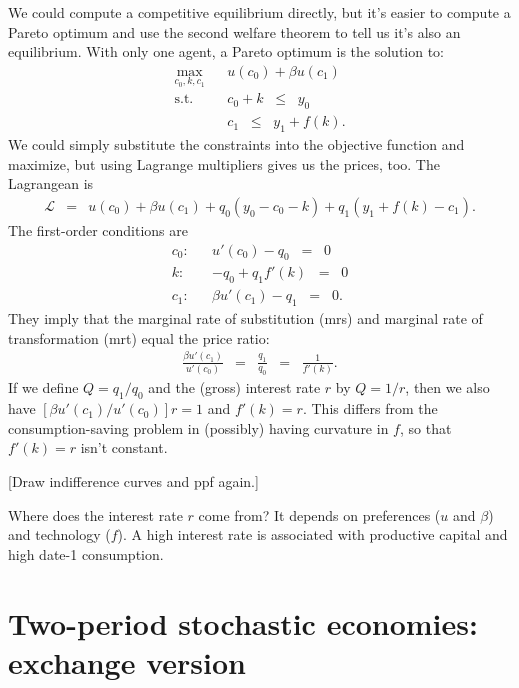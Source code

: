 \documentclass[11pt]{article}
\begin{document}
We could compute a competitive equilibrium directly,
but it's easier to compute a Pareto optimum and
use the second welfare theorem to tell us it's also
an equilibrium.
With only one agent, a Pareto optimum is the solution to:
\begin{eqnarray*}
    \max_{c_0,k,c_1} && u(c_0) + \beta u(c_1) \\
    \mbox{s.t.}   &&  c_0 + k \;\;\leq\;\; y_0 \\
                  &&  c_1 \;\;\leq\;\;  y_1 + f(k) .
\end{eqnarray*}
We could simply substitute the constraints into the objective
function and maximize, but using Lagrange multipliers gives us
the prices, too.
The Lagrangean is
\begin{eqnarray*}
    \mathcal{L} &=&  u(c_0) + \beta u(c_1) + q_0 (y_0 - c_0 - k)
                    + q_1 ( y_1 + f(k) - c_1)  .
\end{eqnarray*}
The first-order conditions are
\begin{eqnarray*}
    c_0: &&  u'(c_0) - q_0 \;\;=\;\; 0 \\
    k: &&  - q_0 + q_1 f'(k)  \;\;=\;\; 0 \\
    c_1: &&  \beta u'(c_1) - q_1 \;\;=\;\; 0 .
\end{eqnarray*}
They imply that the marginal rate of substitution (mrs)
and marginal rate of transformation (mrt)
equal the price ratio:
\begin{eqnarray*}
    \frac{\beta u'(c_1)}{u'(c_0)} &=& \frac{q_1}{q_0} \;\;=\;\; \frac{1}{f'(k)} .
\end{eqnarray*}
If we define $Q = q_1/q_0$ and the (gross) interest rate $r$ by $Q = 1/r$,
then we also have $ [\beta u'(c_1)/u'(c_0)] r = 1$ and $f'(k) = r$.
This differs from the consumption-saving problem in (possibly) having curvature
in $f$, so that $f'(k) = r$ isn't constant.

[Draw indifference curves and ppf again.]

Where does the interest rate $r$ come from?
It depends on preferences ($u$ and $\beta$) and technology ($f$).
A high interest rate is associated with productive capital
and high date-1 consumption.


\section{Two-period stochastic economies:  exchange version}
\end{document}
